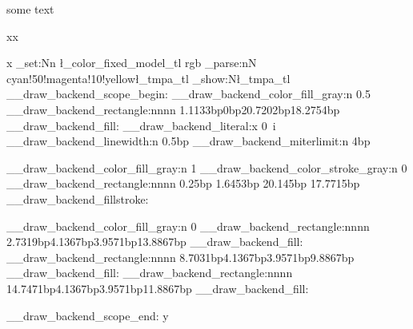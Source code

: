 \documentclass{article}
\begin{document}
 some text
\makeatletter

x\atfi@acroPushPin x


x\ExplSyntaxOn
\tl_set:Nn \l_color_fixed_model_tl {rgb}
\color_parse:nN {cyan!50!magenta!10!yellow}\l_tmpa_tl
\tl_show:N\l_tmpa_tl
\__draw_backend_scope_begin:
\__draw_backend_color_fill_gray:n {0.5}
\__draw_backend_rectangle:nnnn {1.1133bp}{0bp}{20.7202bp}{18.2754bp}
\__draw_backend_fill:
\__draw_backend_literal:x {0~i} %
\__draw_backend_linewidth:n {0.5bp}
\__draw_backend_miterlimit:n {4bp}

\__draw_backend_color_fill_gray:n {1}
\__draw_backend_color_stroke_gray:n {0}
\__draw_backend_rectangle:nnnn {0.25bp} {1.6453bp} {20.145bp} {17.7715bp}
\__draw_backend_fillstroke:

\__draw_backend_color_fill_gray:n {0}
\__draw_backend_rectangle:nnnn {2.7319bp}{4.1367bp}{3.9571bp}{13.8867bp}
\__draw_backend_fill:
\__draw_backend_rectangle:nnnn {8.7031bp}{4.1367bp}{3.9571bp}{9.8867bp}
\__draw_backend_fill:
\__draw_backend_rectangle:nnnn {14.7471bp}{4.1367bp}{3.9571bp}{11.8867bp}
\__draw_backend_fill:

\__draw_backend_scope_end:
\ExplSyntaxOff
y
\show\atfi@color@inline
\def\atfi@acroGraph@data{%
  \atfi@GSAVE
  0.5 \atfi@SETGRAYFILL
  1.1133 0 20.7202 18.2754 \atfi@RECTFILL
  0 \atfi@SETFLAT
  0.5 \atfi@SETLINEWIDTH
  4 \atfi@SETMITERLIMIT
  \atfi@RECTSTROKEFILL{%
    1 \atfi@SETGRAYFILL
  }{%
    0 \atfi@SETGRAYSTROKE
  }{%
    0.25 1.6453 20.145 17.7715 %
  }%
  0 \atfi@SETGRAYFILL
  2.7319 4.1367 3.9571 13.8867 \atfi@RECTFILL
  8.7031 4.1367 3.9571 9.8867 \atfi@RECTFILL
  14.7471 4.1367 3.9571 11.8867 \atfi@RECTFILL
  \atfi@color@inline{FILL}%
  1.689 3.0938 3.9571 13.8867 \atfi@RECTFILL
  7.6602 3.0938 3.9571 9.8867 \atfi@RECTFILL
  13.7041 3.0938 3.9571 11.8867 \atfi@RECTFILL
  \atfi@GRESTORE
}

\def\atfi@acroPushPin@data{%
  \atfi@GSAVE
  1 \atfi@SETLINEWIDTH
  1 6   \atfi@MOVETO
  11 6  \atfi@LINETO
  11 13 \atfi@LINETO
  12 13 \atfi@LINETO
  14 11 \atfi@LINETO
  21 11 \atfi@LINETO
  22 12 \atfi@LINETO
  23 12 \atfi@LINETO
  23 2  \atfi@LINETO
  22 2  \atfi@LINETO
  21 3  \atfi@LINETO
  14 3  \atfi@LINETO
  12 1  \atfi@LINETO
  11 1  \atfi@LINETO
  11 6  \atfi@LINETO
  \atfi@FILLSTROKE{%
    \atfi@color@inline{FILL}%
  }{%
    0 \atfi@SETGRAYSTROKE
  }%
  0.5 \atfi@SETGRAYSTROKE
  0 7  \atfi@MOVETO
  10 7 \atfi@LINETO
  10 8 \atfi@LINETO
  1 8  \atfi@LINETO
  \atfi@STROKE
  1 \atfi@SETGRAYSTROKE
  12 12 \atfi@MOVETO
  14 10 \atfi@LINETO
  22 10 \atfi@LINETO
  22 11 \atfi@LINETO
  \atfi@STROKE
  \atfi@GRESTORE
}
\end{document}
